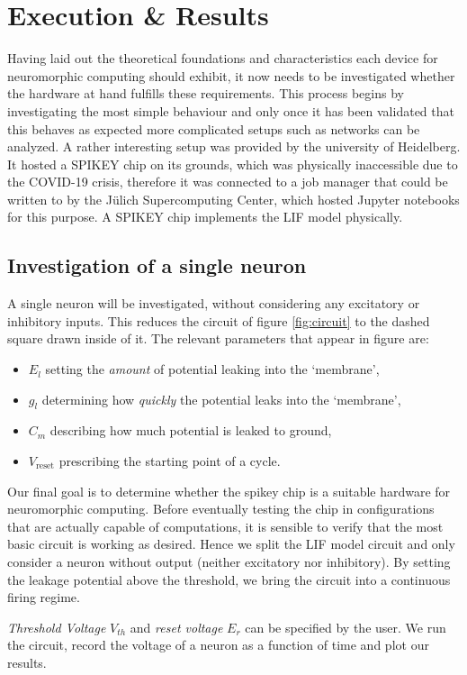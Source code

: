 \documentclass[a4paper,twocolumn]{article}
\begin{document}
\section{Execution \& Results}
Having laid out the theoretical foundations and characteristics each device
for neuromorphic computing should exhibit,  it now needs to be investigated
whether the hardware at hand fulfills these requirements.  This process begins
by investigating the most simple behaviour and only once it has been validated
that this behaves as expected more complicated setups such as networks
can be analyzed.
A rather interesting setup was provided by the university of Heidelberg. It
hosted a SPIKEY chip on its grounds, which was physically inaccessible due to
the COVID-19 crisis, therefore it was connected to a job manager that could be
written to by the Jülich Supercomputing Center, which hosted Jupyter notebooks
for this purpose. A SPIKEY chip implements the LIF model physically.

\subsection{Investigation of a single neuron}
A single neuron will be investigated,  without considering any excitatory or
inhibitory inputs.  This reduces the circuit of figure \ref{fig:circuit}
to the dashed square drawn inside of it. The relevant parameters
that appear in figure are:
\begin{itemize}
    \item $E_l$ setting the \textit{amount} of potential leaking into the `membrane',
    \item $g_l$ determining how \textit{quickly} the potential leaks into the `membrane',
    \item $C_m$ describing how much potential is leaked to ground,
    \item $V_\text{reset}$ prescribing the starting point of a cycle.
\end{itemize}

Our final goal is to determine whether the spikey chip is a suitable hardware for
neuromorphic computing.  Before eventually testing the chip in configurations
that are actually capable of computations,  it is sensible to verify that the
most basic circuit is working as desired.  Hence we split the LIF model circuit
and only consider a neuron without output (neither excitatory nor inhibitory).
By setting the leakage potential above the threshold, we bring the circuit into
a continuous firing regime. \par
\textit{Threshold Voltage} $V_{th}$ and \textit{reset voltage} $E_r$ can be
specified by the user.  We run the circuit,  record the voltage of a neuron as
a function of time and plot our results.
\end{document}
